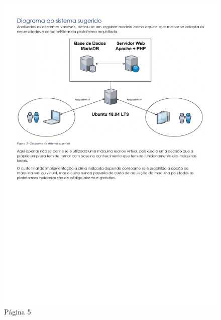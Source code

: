 \begin{figure}[H]
	\centering
	\includegraphics[width=\linewidth, frame]{figuras/Alternativas/pag5.jpg}
	\caption{Página 5}
	\label{fig:anexo_a_5}
\end{figure}